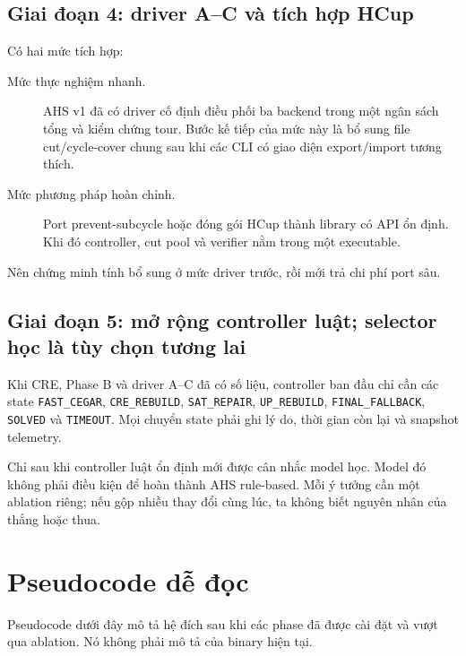 \documentclass[11pt,a4paper,oneside]{scrreprt}
\newcommand{\code}[1]{\texttt{#1}}
\begin{document}
\section{Giai đoạn 4: driver A--C và tích hợp HCup}

Có hai mức tích hợp:

\begin{description}
  \item[Mức thực nghiệm nhanh.] AHS v1 đã có driver cố định điều phối ba backend trong một ngân sách tổng và kiểm chứng tour. Bước kế tiếp của mức này là bổ sung file cut/cycle-cover chung sau khi các CLI có giao diện export/import tương thích.
  \item[Mức phương pháp hoàn chỉnh.] Port prevent-subcycle hoặc đóng gói HCup thành library có API ổn định. Khi đó controller, cut pool và verifier nằm trong một executable.
\end{description}

Nên chứng minh tính bổ sung ở mức driver trước, rồi mới trả chi phí port sâu.

\section{Giai đoạn 5: mở rộng controller luật; selector học là tùy chọn tương lai}

Khi CRE, Phase B và driver A--C đã có số liệu, controller ban đầu chỉ cần các state \code{FAST\_CEGAR}, \code{CRE\_REBUILD}, \code{SAT\_REPAIR}, \code{UP\_REBUILD}, \code{FINAL\_FALLBACK}, \code{SOLVED} và \code{TIMEOUT}. Mọi chuyển state phải ghi lý do, thời gian còn lại và snapshot telemetry.

Chỉ sau khi controller luật ổn định mới được cân nhắc model học. Model đó không phải điều kiện để hoàn thành AHS rule-based. Mỗi ý tưởng cần một ablation riêng; nếu gộp nhiều thay đổi cùng lúc, ta không biết nguyên nhân của thắng hoặc thua.

\chapter{Pseudocode dễ đọc}

Pseudocode dưới đây mô tả hệ đích sau khi các phase đã được cài đặt và vượt qua ablation. Nó không phải mô tả của binary hiện tại.
\end{document}
